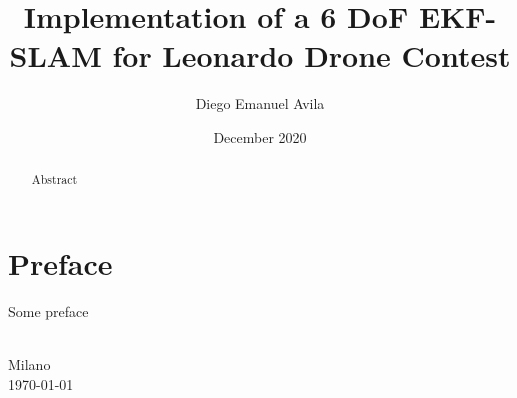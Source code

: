 \documentclass[10pt,a4paper,twoside]{memoir} %
\title{Implementation of a 6 DoF EKF-SLAM for Leonardo Drone Contest} %
\author{Diego Emanuel Avila} %
\date{December 2020} %
\begin{document}
\begin{titlingpage}
\maketitle %
\end{titlingpage}

\frontmatter %


\section*{Preface}
Some preface

\begin{flushright}
\textsc{\theauthor}\\
Milano\\
\today
{}
\end{flushright}

\cleartoverso %


\begin{abstract}
Abstract

\end{abstract}

\cleartoverso %


\tableofcontents* %

\cleartoverso %


\listoffigures %
\end{document}
